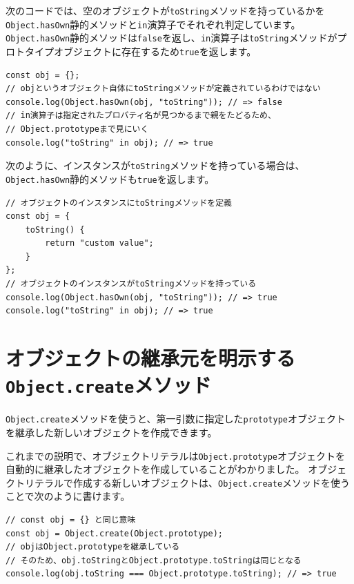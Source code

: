 次のコードでは、空のオブジェクトが\texttt{toString}メソッドを持っているかを\texttt{Object.hasOwn}静的メソッドと\texttt{in}演算子でそれぞれ判定しています。
\texttt{Object.hasOwn}静的メソッドは\texttt{false}を返し、\texttt{in}演算子は\texttt{toString}メソッドがプロトタイプオブジェクトに存在するため\texttt{true}を返します。

\begin{lstlisting}
const obj = {};
// objというオブジェクト自体にtoStringメソッドが定義されているわけではない
console.log(Object.hasOwn(obj, "toString")); // => false
// in演算子は指定されたプロパティ名が見つかるまで親をたどるため、
// Object.prototypeまで見にいく
console.log("toString" in obj); // => true
\end{lstlisting}

次のように、インスタンスが\texttt{toString}メソッドを持っている場合は、\texttt{Object.hasOwn}静的メソッドも\texttt{true}を返します。

\begin{lstlisting}
// オブジェクトのインスタンスにtoStringメソッドを定義
const obj = {
    toString() {
        return "custom value";
    }
};
// オブジェクトのインスタンスがtoStringメソッドを持っている
console.log(Object.hasOwn(obj, "toString")); // => true
console.log("toString" in obj); // => true
\end{lstlisting}

\hypertarget{create-method}{%
\section{\texorpdfstring{オブジェクトの継承元を明示する\texttt{Object.create}メソッド}{オブジェクトの継承元を明示するObject.createメソッド}}\label{create-method}}

\texttt{Object.create}メソッドを使うと、第一引数に指定した\texttt{prototype}オブジェクトを継承した新しいオブジェクトを作成できます。

これまでの説明で、オブジェクトリテラルは\texttt{Object.prototype}オブジェクトを自動的に継承したオブジェクトを作成していることがわかりました。
オブジェクトリテラルで作成する新しいオブジェクトは、\texttt{Object.create}メソッドを使うことで次のように書けます。

\begin{lstlisting}
// const obj = {} と同じ意味
const obj = Object.create(Object.prototype);
// objはObject.prototypeを継承している
// そのため、obj.toStringとObject.prototype.toStringは同じとなる
console.log(obj.toString === Object.prototype.toString); // => true
\end{lstlisting}

